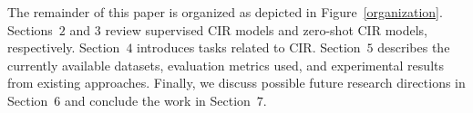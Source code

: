 The remainder of this paper is organized as depicted in Figure~\ref{organization}. Sections~$2$ and $3$ review supervised CIR models and zero-shot CIR models, respectively. Section~$4$ introduces  tasks related to CIR. Section~$5$ describes the currently available datasets, evaluation metrics used, and experimental results from existing approaches. Finally, we discuss possible future research directions in Section~$6$ and conclude the work in Section~$7$. 